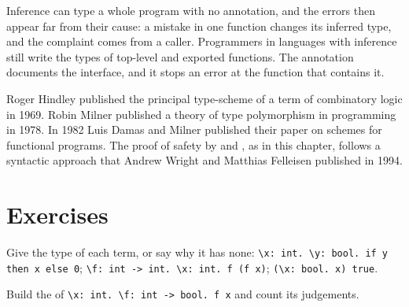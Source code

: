 \label{lst:b3:type-systems:borrow}

\label{out:b3:type-systems:borrow}

\begin{inpractice}
Inference can type a whole program with no annotation, and the errors then appear far from their cause: a mistake in one function changes its inferred type, and the complaint comes from a caller. Programmers in languages with inference still write the types of top-level and exported functions. The annotation documents the interface, and it stops an error at the function that contains it.
\end{inpractice}

\begin{history}
Roger Hindley published the principal type-scheme of a term of combinatory logic in 1969. %
Robin Milner published a theory of type polymorphism in programming in 1978. %
In 1982 Luis Damas and Milner published their paper on  schemes for functional programs. %
The proof of safety by  and , as in this chapter, follows a syntactic approach that Andrew Wright and Matthias Felleisen published in 1994. %
\end{history}

\section{Exercises}\label{sec:b3:type-systems:exercises}

\begin{exercise}[$\star$]\label{exo:b3:type-systems:1}
Give the type of each term, or say why it has none: \texttt{\textbackslash{}x:\ int.\ \textbackslash{}y:\ bool.\ if y then x else 0}; \texttt{\textbackslash{}f:\ int -> int.\ \textbackslash{}x:\ int.\ f (f x)}; \texttt{(\textbackslash{}x:\ bool.\ x) true}.
\end{exercise}

\begin{exercise}[$\star$]\label{exo:b3:type-systems:2}
Build the  of \texttt{\textbackslash{}x:\ int.\ \textbackslash{}f:\ int -> bool.\ f x} and count its judgements.
\end{exercise}

